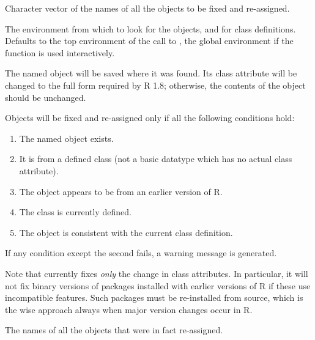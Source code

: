%
\begin{Arguments}
\begin{ldescription}
\item[\code{names}]  Character vector of the names of all the objects to be
fixed and re-assigned.
\item[\code{where}] The environment from which to look for the objects, and
for class definitions.  Defaults to the top environment of the
call to , the global environment if the function
is used interactively.
\end{ldescription}
\end{Arguments}
%
\begin{Details}\relax
The named object will be saved where it was found.  Its class
attribute will be changed to the full form required by R 1.8;
otherwise, the contents of the object should be unchanged.

Objects will be fixed and re-assigned only if all the following
conditions hold:
\begin{enumerate}

\item The named object exists.
\item It is from a defined class (not a basic datatype which
has no actual class attribute).
\item The object appears to be from an earlier version of R.
\item The class is currently defined.
\item The object is consistent with the current class definition.

\end{enumerate}

If any condition except the second fails, a warning message is
generated.

Note that  currently fixes \emph{only} the change in
class attributes.  In particular, it will not fix binary versions of
packages installed with earlier versions of R if these use
incompatible features.  Such packages must be re-installed from
source, which is the wise approach always when major version changes
occur in R.

\end{Details}
%
\begin{Value}
The names of all the objects that were in fact re-assigned.
\end{Value}
